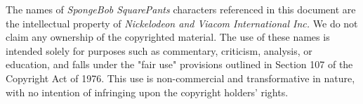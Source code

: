 \renewcommand{\thesection}{\Alph{section}}
The names of \textit{SpongeBob SquarePants} characters referenced in this document are the intellectual property of \textit{Nickelodeon and Viacom International Inc.}
We do not claim any ownership of the copyrighted material. The use of these names is intended solely for purposes such as commentary, criticism, analysis, 
or education, and falls under the "fair use" provisions outlined in Section 107 of the Copyright Act of 1976. This use is non-commercial and transformative 
in nature, with no intention of infringing upon the copyright holders' rights.

